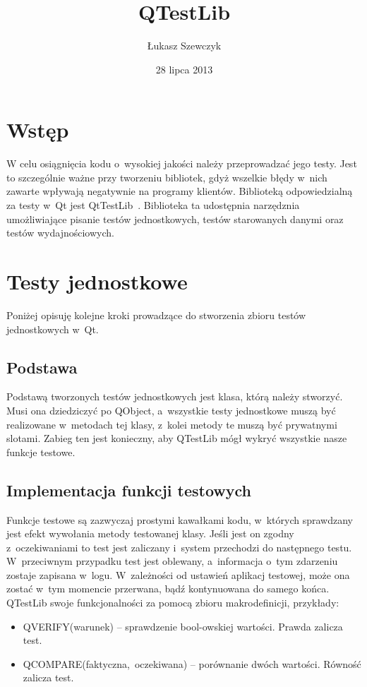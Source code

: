 \documentclass[11pt,twoside,a4paper,final]{article}
\begin{document}
\date{28 lipca 2013}
\title{QTestLib \\}

\author{Łukasz Szewczyk}
\maketitle


\section{Wstęp}
W celu osiągnięcia kodu o~wysokiej jakości należy przeprowadzać jego testy. Jest to szczególnie ważne przy tworzeniu bibliotek, gdyż wszelkie błędy w~nich zawarte wpływają negatywnie na programy klientów.
Biblioteką odpowiedzialną za testy w~Qt jest QtTestLib~\cite{qtest}. Biblioteka ta udostępnia narzędznia umożliwiające pisanie testów jednostkowych, testów starowanych danymi oraz testów wydajnościowych. 

\section{Testy jednostkowe}
Poniżej opisuję kolejne kroki prowadzące do stworzenia zbioru testów jednostkowych w~Qt.

\subsection{Podstawa}
Podstawą tworzonych testów jednostkowych jest klasa, którą należy stworzyć. Musi ona dziedziczyć po QObject, a~wszystkie testy jednostkowe muszą być realizowane w~metodach tej klasy, z~kolei metody te muszą być prywatnymi slotami. Zabieg ten jest konieczny, aby QTestLib mógł wykryć wszystkie nasze funkcje testowe.

\subsection{Implementacja funkcji testowych}
Funkcje testowe są zazwyczaj prostymi kawałkami kodu, w~których sprawdzany jest efekt wywołania metody testowanej klasy. Jeśli jest on zgodny z~oczekiwaniami to test jest zaliczany i~system przechodzi do następnego testu. W~przeciwnym przypadku test jest oblewany, a~informacja o~tym zdarzeniu zostaje zapisana w~logu. W~zależności od ustawień aplikacj testowej, może ona zostać w~tym momencie przerwana, bądź kontynuowana do samego końca. 
QTestLib swoje funkcjonalności za pomocą zbioru makrodefinicji, przykłady:
\begin{itemize}
\item{QVERIFY(warunek) -- sprawdzenie bool-owskiej wartości. Prawda zalicza test.}
\item{QCOMPARE(faktyczna,~oczekiwana) -- porównanie dwóch wartości. Równość zalicza test.}
\end{itemize}
\end{document}
